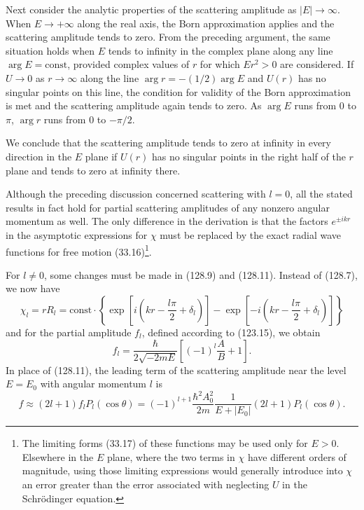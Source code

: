 Next consider the analytic properties of the scattering amplitude as $|E|\to\infty$. When $E\to+\infty$ along the real axis, the Born approximation applies and the scattering amplitude tends to zero. From the preceding argument, the same situation holds when $E$ tends to infinity in the complex plane along any line $\arg E=\mathrm{const}$, provided complex values of $r$ for which $Er^2>0$ are considered. If $U\to0$ as $r\to\infty$ along the line $\arg r=-(1/2)\arg E$ and $U(r)$ has no singular points on this line, the condition for validity of the Born approximation is met and the scattering amplitude again tends to zero. As $\arg E$ runs from $0$ to $\pi$, $\arg r$ runs from $0$ to $-\pi/2$.

We conclude that the scattering amplitude tends to zero at infinity in every direction in the $E$ plane if $U(r)$ has no singular points in the right half of the $r$ plane and tends to zero at infinity there.

Although the preceding discussion concerned scattering with $l=0$, all the stated results in fact hold for partial scattering amplitudes of any nonzero angular momentum as well. The only difference in the derivation is that the factors $e^{\pm ikr}$ in the asymptotic expressions for $\chi$ must be replaced by the exact radial wave functions for free motion (33.16)\footnote{The limiting forms (33.17) of these functions may be used only for $E>0$. Elsewhere in the $E$ plane, where the two terms in $\chi$ have different orders of magnitude, using those limiting expressions would generally introduce into $\chi$ an error greater than the error associated with neglecting $U$ in the Schrödinger equation.}.

For $l\ne0$, some changes must be made in (128.9) and (128.11). Instead of (128.7), we now have
\begin{equation}
 \chi_l=rR_l=\mathrm{const}\cdot\left\{\exp\left[i\left(kr-\frac{l\pi}2+\delta_l\right)\right]
 -\exp\left[-i\left(kr-\frac{l\pi}2+\delta_l\right)\right]\right\}
 \tag{128.15}
\end{equation}
and for the partial amplitude $f_l$, defined according to (123.15), we obtain
\begin{equation}
 f_l=\frac{\hbar}{2\sqrt{-2mE}}\left[(-1)^l\frac AB+1\right].
 \tag{128.16}
\end{equation}
In place of (128.11), the leading term of the scattering amplitude near the level $E=E_0$ with angular momentum $l$ is
\begin{equation}
 f\approx(2l+1)f_lP_l(\cos\theta)=(-1)^{l+1}\frac{\hbar^2A_0^2}{2m}
 \frac1{E+|E_0|}(2l+1)P_l(\cos\theta).
 \tag{128.17}
\end{equation}
